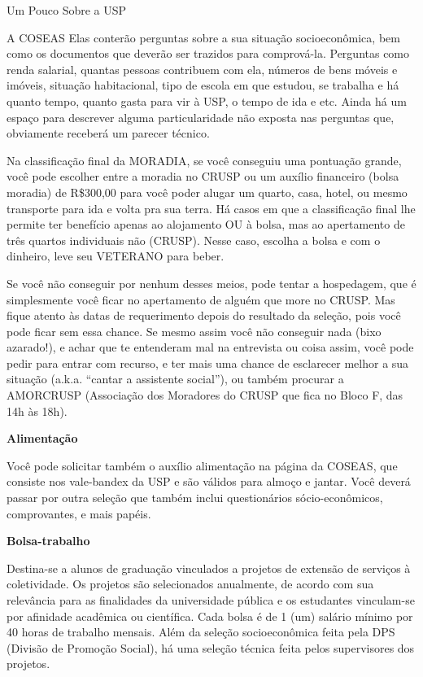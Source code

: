 \begin{secao}{Um Pouco Sobre a USP}
\begin{subsecao}{A COSEAS}
Elas conterão perguntas sobre a sua situação socioeconômica, bem como os
documentos que deverão ser trazidos para comprová-la. Perguntas como renda
salarial, quantas pessoas contribuem com ela, números de bens móveis e imóveis,
situação habitacional, tipo de escola em que estudou, se trabalha e há quanto
tempo, quanto gasta para vir à USP, o tempo de ida e etc. Ainda há um espaço
para descrever alguma particularidade não exposta nas perguntas que, obviamente
receberá um parecer técnico.

Na classificação final da MORADIA, se você conseguiu uma pontuação grande, você
pode escolher entre a moradia no CRUSP ou um auxílio financeiro (bolsa moradia)
de R\$300,00 para você poder alugar um quarto, casa, hotel, ou mesmo transporte
para ida e volta pra sua terra.  Há casos em que a classificação final lhe
permite ter benefício apenas ao alojamento OU à bolsa, mas ao apertamento de
três quartos individuais não (CRUSP). Nesse caso, escolha a bolsa e com o
dinheiro, leve seu VETERANO para beber.

Se você não conseguir por nenhum desses meios, pode tentar a hospedagem, que é
simplesmente você ficar no apertamento de alguém que more no CRUSP. Mas fique
atento às datas de requerimento depois do resultado da seleção, pois você pode
ficar sem essa chance. Se mesmo assim você não conseguir nada (bixo azarado!),
e achar que te entenderam mal na entrevista ou coisa assim, você pode pedir para
entrar com recurso, e ter mais uma chance de esclarecer melhor a sua situação
(a.k.a. “cantar a assistente social”), ou também procurar a
AMORCRUSP (Associação dos Moradores do CRUSP que fica no Bloco F, das 14h às 18h).

{\bf Alimentação}

Você pode solicitar também o auxílio alimentação na página da COSEAS, que
consiste nos vale-bandex da USP e são válidos para almoço e jantar. Você deverá
passar por outra seleção que também inclui questionários sócio-econômicos,
comprovantes, e mais papéis.

{\bf Bolsa-trabalho}

Destina-se a alunos de graduação vinculados a projetos de extensão de serviços à
coletividade. Os projetos são selecionados anualmente, de acordo com sua relevância
para as finalidades da universidade pública e os estudantes vinculam-se por
afinidade acadêmica ou científica. Cada bolsa é de 1 (um) salário mínimo por
40 horas de trabalho mensais. Além da seleção socioeconômica feita pela
DPS (Divisão de Promoção Social), há uma seleção técnica feita pelos supervisores
dos projetos.


\end{subsecao}
\end{secao}
